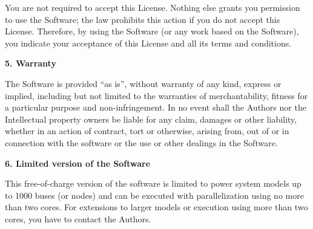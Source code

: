 You are not required to accept this License. Nothing else grants you permission to use the Software; the law prohibits this action if you do not accept this License. Therefore, by using the Software (or any work based on the Software), you indicate your acceptance of this License and all its terms and conditions.

{\bf \large 5. Warranty}

The Software is provided ``as is'', without warranty of any kind, express or implied, including but not limited to the warranties of merchantability, fitness for a particular purpose and non-infringement. In no event shall the Authors nor the Intellectual property owners be liable for any claim, damages or other liability, whether in an action of contract, tort or otherwise, arising from, out of or in connection with the software or the use or other dealings in the Software.

{\bf \large 6. Limited version of the Software}

This free-of-charge version of the software is limited to power system models up to 1000 buses (or nodes) and can be executed with parallelization using no more than two cores. For extensions to larger models or execution using more than two cores, you have to contact the Authors.
